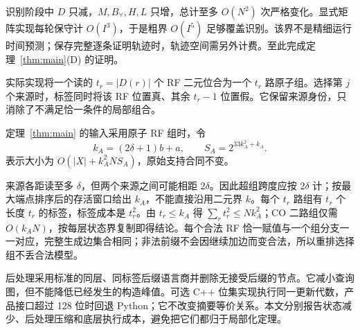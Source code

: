 识别阶段中 $D$ 只减，$M,B_\forall,H,L$ 只增，总计至多 $O(N^2)$ 次严格变化。显式矩阵实现每轮保守计 $O(I^3)$，于是粗界 $O(I^5)$ 足够覆盖识别。该界不是精细运行时间预测；保存完整逐条证明轨迹时，轨迹空间需另外计费。至此完成定理~\ref{thm:main}(D) 的证明。

实际实现将一个读的 $t_r=|D(r)|$ 个 RF 二元位合为一个 $t_r$ 路原子组。选择第 $j$ 个来源时，标签同时将该 RF 位置真、其余 $t_r-1$ 位置假。它保留来源身份，只消除了不满足恰一条件的局部组合。

\begin{cprop}[原子分组的保守界]\label{prop:atomic}
定理~\ref{thm:main} 的输入采用原子 RF 组时，令
\[
 k_A=(2\delta+1)b+a,\qquad S_A=2^{33k_A^2+k_A}.
\]
表示大小为 $O(|X|+k_A^2NS_A)$，原始支持合同不变。
\end{cprop}
\begin{cproof}
来源各距读至多 $\delta$，但两个来源之间可能相距 $2\delta$。因此超组跨度应按 $2\delta$ 计；按最大端点排序后的存活窗口给出 $k_A$，不能直接沿用二元界 $k$。每个 $t_r$ 路组有 $t_r$ 个长度 $t_r$ 的标签，标签成本是 $t_r^2$。由 $t_r\le k_A$ 得 $\sum_r t_r^2\le Nk_A^2$；CO 二路组仅需 $O(k_AN)$，按每层状态界复制即得结论。每个合法 RF 恰一赋值与一个组分支一一对应，完整生成边集合相同；非法前缀不会因继续加边而变合法，所以重排选择组不丢合法模型。
\end{cproof}

后处理采用标准的同层、同标签后缀语言商并删除无接受后缀的节点。它减小查询图，但不能降低已经发生的构造峰值。可选 C++ 位集实现执行同一更新代数，产品接口超过 128 位时回退 Python；它不改变摘要等价关系。本文分别报告状态减少、后处理压缩和底层执行成本，避免把它们都归于局部化定理。
